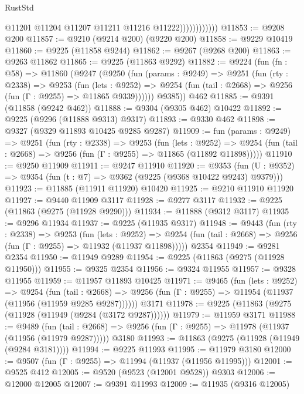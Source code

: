 \begin{lexlean}{RustStd}
\begin{coremodule}
                            @11201
                            @11204
                            @11207
                            @11211
                            @11216
                            @11222))))))))))))
@11853 := @9208 @200
@11857 := @9210 (@9214 @200) (@9220 @200)
@11858 := @9229 @10419
@11860 := @9225 (@11858 @9244)
@11862 := @9267 (@9268 @200)
@11863 := @9263 @11862
@11865 := @9225 (@11863 @9292)
@11882 := @9224
    (fun (fn : @58) =>
    @11860
      (@9247
        (@9250
          (fun (params : @9249) =>
          @9251
            (fun (rty : @2338) =>
            @9253
              (fun (lets : @9252) =>
              @9254 (fun (tail : @2668) => @9256 (fun (Γ : @9255) => @11865 @9339))))))
        @9385))
    @462
@11885 := @9391 (@11858 (@9242 @462))
@11888 := @9304 (@9305 @462) @10422
@11892 := @9225 (@9296 (@11888 @9313) @9317)
@11893 := @9330 @462
@11898 := @9327 (@9329 @11893 @10425 @9285 @9287)
@11909 := fun (params : @9249) =>
  @9251
    (fun (rty : @2338) =>
    @9253
      (fun (lets : @9252) =>
      @9254 (fun (tail : @2668) => @9256 (fun (Γ : @9255) => @11865 (@11892 @11898)))))
@11910 := @9250 @11909
@11911 := @9247 @11910
@11920 := @9353
    (fun (U : @9352) => @9354 (fun (t : @7) => @9362 (@9225 (@9368 @10422 @9243) @9379)))
@11923 := @11885 (@11911 @11920) @10420
@11925 := @9210 @11910 @11920
@11927 := @9440 @11909 @3117
@11928 := @9277 @3117
@11932 := @9225 (@11863 (@9275 (@11928 @9290)))
@11934 := @11888 (@9312 @3117)
@11935 := @9296 @11934
@11937 := @9225 (@11935 @9317)
@11948 := @9443
    (fun (rty : @2338) =>
    @9253
      (fun (lets : @9252) =>
      @9254 (fun (tail : @2668) => @9256 (fun (Γ : @9255) => @11932 (@11937 @11898)))))
    @2354
@11949 := @9281 @2354
@11950 := @11949 @9289
@11954 := @9225 (@11863 (@9275 (@11928 @11950)))
@11955 := @9325 @2354
@11956 := @9324 @11955
@11957 := @9328 @11955
@11959 := @11957 @11893 @10425
@11971 := @9465
    (fun (lets : @9252) =>
    @9254
      (fun (tail : @2668) =>
      @9256 (fun (Γ : @9255) => @11954 (@11937 (@11956 (@11959 @9285 @9287))))))
    @3171
@11978 := @9225 (@11863 (@9275 (@11928 (@11949 (@9284 (@3172 @9287))))))
@11979 := @11959 @3171
@11988 := @9489
    (fun (tail : @2668) => @9256 (fun (Γ : @9255) => @11978 (@11937 (@11956 (@11979 @9287)))))
    @3180
@11993 := @11863 (@9275 (@11928 (@11949 (@9284 @3181))))
@11994 := @9225 @11993
@11995 := @11979 @3180
@12000 := @9507 (fun (Γ : @9255) => @11994 (@11937 (@11956 @11995)))
@12001 := @9525 @412
@12005 := @9520 (@9523 (@12001 @9528)) @9303
@12006 := @12000 @12005
@12007 := @9391 @11993
@12009 := @11935 (@9316 @12005)

\end{coremodule}
\end{lexlean}
